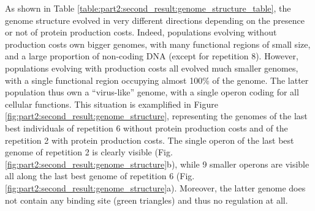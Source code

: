 As shown in Table \ref{table:part2:second_result:genome_structure_table}, the genome structure evolved in very different directions depending on the presence or not of protein production costs. Indeed, populations evolving without production costs own bigger genomes, with many functional regions of small size, and a large proportion of non-coding DNA (except for repetition 8). However, populations evolving with production costs all evolved much smaller genomes, with a single functional region occupying almost 100\% of the genome. The latter population thus own a ``virus-like'' genome, with a single operon coding for all cellular functions. This situation is examplified in Figure \ref{fig:part2:second_result:genome_structure}, representing the genomes of the last best individuals of repetition 6 without protein production costs and of the repetition 2 with protein production costs. The single operon of the last best genome of repetition 2 is clearly visible (Fig. \ref{fig:part2:second_result:genome_structure}b), while 9 smaller operons are visible all along the last best genome of repetition 6 (Fig. \ref{fig:part2:second_result:genome_structure}a). Moreover, the latter genome does not contain any binding site (green triangles) and thus no regulation at all.

\begin{table}[!ht]
\begin{adjustwidth}{-0in}{0in}
\centering
\caption[Genome structure of the last best individuals in environment A.]{{\bf Genome structure of the last best individuals in environment A.} For each last best individual, we extracted the genome size, the proportion of coding sequences, the number of functional regions, and the mean size of functional regions. 4 genomes are evaluated without protein production costs, 2 with protein production costs.}
\label{table:part2:second_result:genome_structure_table}
\end{adjustwidth}
\end{table}

